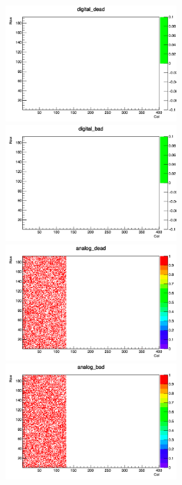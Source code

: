 \begin{figure}[bpt]\centering
  \begin{minipage}{0.45\hsize}
    \includegraphics[width=6.5cm]{./data/analysis_result/digital_dead.png}
  \end{minipage}
  \begin{minipage}{0.45\hsize}
    \includegraphics[width=6.5cm]{./data/analysis_result/digital_bad.png}
  \end{minipage}
  \begin{minipage}{0.45\hsize}
    \includegraphics[width=6.5cm]{./data/analysis_result/analog_dead.png}
  \end{minipage}
  \begin{minipage}{0.45\hsize}
    \includegraphics[width=6.5cm]{./data/analysis_result/analog_bad.png}

\end{minipage}
\end{figure}
